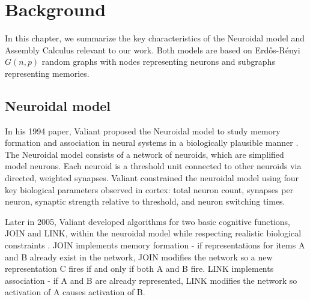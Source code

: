 \chapter{Background}

In this chapter, we summarize the key characteristics of the Neuroidal model and Assembly Calculus relevant to our work. Both models are based on Erdős-R{\'e}nyi $G(n,p)$ random graphs with nodes representing neurons and subgraphs representing memories. 

\section{Neuroidal model}

In his 1994 paper, Valiant proposed the Neuroidal model to study memory formation and association in neural systems in a biologically plausible manner \cite{valiant1994circuits}. The Neuroidal model consists of a network of neuroids, which are simplified model neurons. Each neuroid is a threshold unit connected to other neuroids via directed, weighted synapses. Valiant constrained the neuroidal model using four key biological parameters observed in cortex: total neuron count, synapses per neuron, synaptic strength relative to threshold, and neuron switching times.

Later in 2005, Valiant developed algorithms for two basic cognitive functions, JOIN and LINK, within the neuroidal model while respecting realistic biological constraints \cite{valiant2005memorization}. JOIN implements memory formation - if representations for items A and B already exist in the network, JOIN modifies the network so a new representation C fires if and only if both A and B fire. LINK implements association - if A and B are already represented, LINK modifies the network so activation of A causes activation of B.

